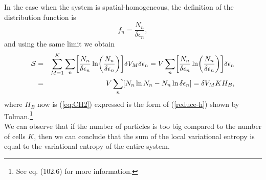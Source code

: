 In the case when the system is spatial-homogeneous, the definition of the distribution function is 
\begin{equation}
    f_{n}=\frac{N_{n}}{ \delta \epsilon_{n} },
\end{equation}
and using the same limit we obtain
\begin{eqnarray}
    \Ss&=& \sum_{M=1}^{K} \sum_n
    \left[  
           \frac{N_{n}}{ \delta \epsilon_{n}} \ln 
           \left( 
                  \frac{N_{n}}{ \delta \epsilon_{n}}
           \right)
    \right]  \de V_M \delta \epsilon_{n} = V \sum_n
    \left[  
           \frac{N_{n}}{ \delta \epsilon_{n}} \ln 
           \left( 
                  \frac{N_{n}}{ \delta \epsilon_{n}}
           \right)
    \right] \delta \epsilon_{n} \nonumber \\
    &=& V \sum_n \left[N_n \ln N_n - N_n \ln \delta \epsilon_n  \right]=\de V_M K H_{B},\label{h-quantic4}
\end{eqnarray}
where $H_{B}$ now is (\ref{eq:CH2}) expressed is the form of (\ref{reduce-h}) shown by Tolman.\footnote{See \cite{bib:tolman} eq. (102.6) for more information.}\\
We can observe that if the number of particles is too big compared to the number of cells $K$, then we can conclude that the sum of the local variational entropy is equal to the variational entropy of the entire system.

